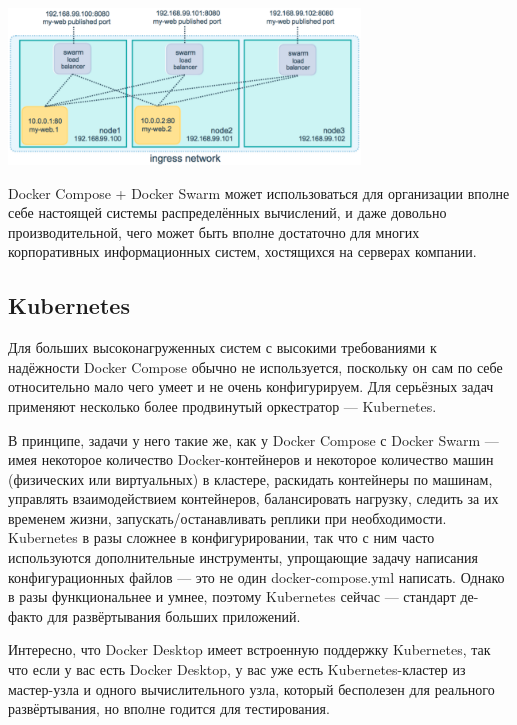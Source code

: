 \documentclass{../../text-style}
\begin{document}
\begin{center}
    \includegraphics[width=0.7\textwidth]{swarmLoadBalancing.png}
\end{center}

Docker Compose + Docker Swarm может использоваться для организации вполне себе настоящей системы распределённых вычислений, и даже довольно производительной, чего может быть вполне достаточно для многих корпоративных информационных систем, хостящихся на серверах компании.

\subsection{Kubernetes}


Для больших высоконагруженных систем с высокими требованиями к надёжности Docker Compose обычно не используется, поскольку он сам по себе относительно мало чего умеет и не очень конфигурируем. Для серьёзных задач применяют несколько более продвинутый оркестратор --- Kubernetes. 

В принципе, задачи у него такие же, как у Docker Compose с Docker Swarm --- имея некоторое количество Docker-контейнеров и некоторое количество машин (физических или виртуальных) в кластере, раскидать контейнеры по машинам, управлять взаимодействием контейнеров, балансировать нагрузку, следить за их временем жизни, запускать/останавливать реплики при необходимости. Kubernetes в разы сложнее в конфигурировании, так что с ним часто используются дополнительные инструменты, упрощающие задачу написания конфигурационных файлов --- это не один docker-compose.yml написать. Однако в разы функциональнее и умнее, поэтому Kubernetes сейчас --- стандарт де-факто для развёртывания больших приложений. 

Интересно, что Docker Desktop имеет встроенную поддержку Kubernetes, так что если у вас есть Docker Desktop, у вас уже есть Kubernetes-кластер из мастер-узла и одного вычислительного узла, который бесполезен для реального развёртывания, но вполне годится для тестирования.
\end{document}
